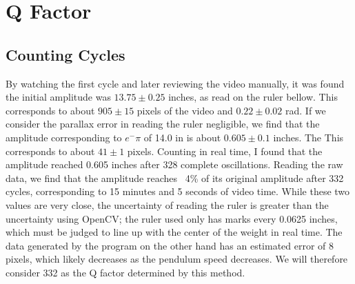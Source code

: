 \documentclass[11pt]{article}
\begin{document}
    \section{Q Factor}
        \subsection{Counting Cycles}
            By watching the first cycle and later reviewing the video manually, it was found the initial amplitude was  $13.75 \pm 0.25$ inches, as read on the ruler bellow. This corresponds to about $905 \pm 15$ pixels of the video and $0.22 \pm 0.02$ rad. If we consider the parallax error in reading the ruler negligible, we find that the amplitude corresponding to $e^-\pi$ of 14.0 in is about $0.605 \pm 0.1$ inches. The This corresponds to about $41 \pm 1$ pixels. Counting in real time, I found that the amplitude reached 0.605 inches after 328 complete oscillations. Reading the raw data, we find that the amplitude reaches ~4\% of its original amplitude after 332 cycles, corresponding to 15 minutes and 5 seconds of video time. While these two values are very close, the uncertainty of reading the ruler is greater than the uncertainty using OpenCV; the ruler used only has marks every 0.0625 inches, which must be judged to line up with the center of the weight in real time. The data generated by the program on the other hand has an estimated error of 8 pixels, which likely decreases as the pendulum speed decreases. We will therefore consider 332 as the Q factor determined by this method. 
        
\end{document}
